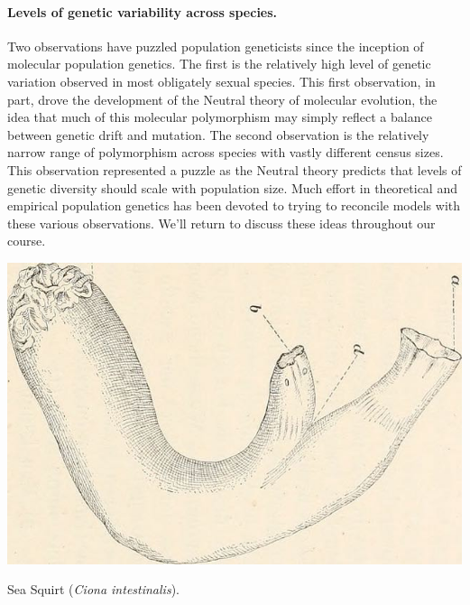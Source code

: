 {\paragraph{Levels of genetic variability across species.}
Two observations have puzzled population geneticists since the
inception of molecular population genetics. The first is the relatively high
level of genetic variation observed in most obligately sexual species.
This first observation, in part, drove the development of the Neutral
theory of molecular evolution, the idea that much of this molecular
polymorphism may simply reflect a balance between genetic drift and
mutation.
The second observation is the relatively narrow range of
polymorphism across species with vastly different census sizes. This
observation represented a puzzle as the Neutral theory predicts that
levels of genetic diversity should scale with population size. Much effort
in theoretical and empirical population genetics has been devoted to
trying to reconcile models with these various observations. We'll
return to discuss these ideas throughout our course.

\begin{marginfigure}[-1cm]
\begin{center}
\includegraphics[width= 0.8 \textwidth]{illustration_images/alleles_genotypes/Ciona_intestinalis/21016139168_2a8a57ded3_z.jpg}
\end{center}
\caption{Sea Squirt ({\it Ciona intestinalis}). } \label{fig:ciona}
\end{marginfigure}

}
